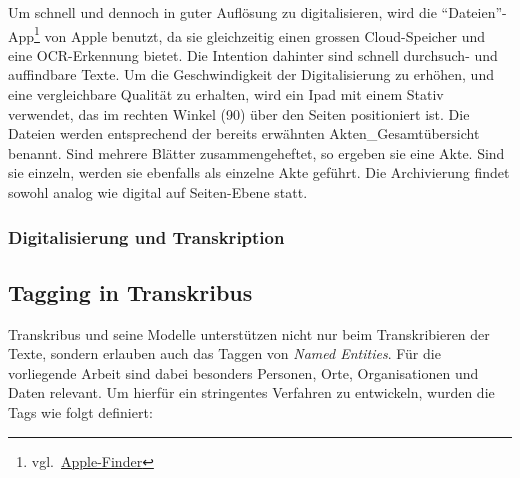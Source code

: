 \documentclass[12pt, a4paper, ngerman, bidi=default]{article}
\begin{document}
    Um schnell und dennoch in guter Auflösung zu digitalisieren, wird die \enquote{Dateien}-App\footnote{vgl.~\href{https://support.apple.com/de-de/guide/preview/prvw28034/mac}{Apple-Finder}} von 
    Apple benutzt, da sie gleichzeitig einen grossen Cloud-Speicher und eine OCR-Erkennung bietet. Die Intention dahinter sind schnell durchsuch- und auffindbare Texte.
    Um die Geschwindigkeit der Digitalisierung zu erhöhen, und eine vergleichbare Qualität zu erhalten, wird ein Ipad mit einem Stativ verwendet, das im rechten Winkel (90\textdegree) über den Seiten positioniert ist. 
    Die Dateien werden entsprechend der bereits erwähnten Akten\_Gesamtübersicht benannt. Sind mehrere Blätter zusammengeheftet, so ergeben sie eine Akte. Sind sie einzeln, werden sie ebenfalls als einzelne Akte geführt. Die Archivierung findet sowohl analog wie digital auf Seiten-Ebene statt.\\
  
    \subsubsection{Digitalisierung und Transkription}
    
    \subsection{Tagging in Transkribus} 

    Transkribus und seine Modelle unterstützen nicht nur beim Transkribieren der Texte, sondern erlauben auch das Taggen von \textit{Named Entities}.  
    Für die vorliegende Arbeit sind dabei besonders Personen, Orte, Organisationen und Daten relevant.  
    Um hierfür ein stringentes Verfahren zu entwickeln, wurden die Tags wie folgt definiert:
    
\end{document}
